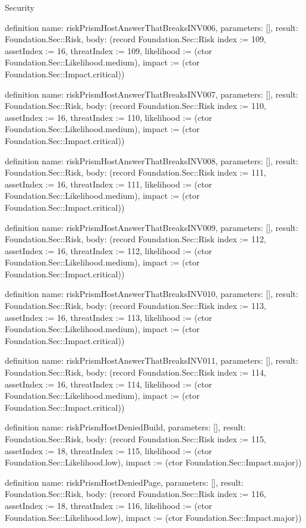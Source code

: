 \begin{lexlean}{Security}
\begin{semanticmodule}
definition{
  name: riskPrismHostAnswerThatBreaksINV006,
  parameters: [],
  result: Foundation.Sec::Risk,
  body: (record Foundation.Sec::Risk {index := 109, assetIndex := 16, threatIndex := 109, likelihood := (ctor Foundation.Sec::Likelihood.medium), impact := (ctor Foundation.Sec::Impact.critical)})
}

definition{
  name: riskPrismHostAnswerThatBreaksINV007,
  parameters: [],
  result: Foundation.Sec::Risk,
  body: (record Foundation.Sec::Risk {index := 110, assetIndex := 16, threatIndex := 110, likelihood := (ctor Foundation.Sec::Likelihood.medium), impact := (ctor Foundation.Sec::Impact.critical)})
}

definition{
  name: riskPrismHostAnswerThatBreaksINV008,
  parameters: [],
  result: Foundation.Sec::Risk,
  body: (record Foundation.Sec::Risk {index := 111, assetIndex := 16, threatIndex := 111, likelihood := (ctor Foundation.Sec::Likelihood.medium), impact := (ctor Foundation.Sec::Impact.critical)})
}

definition{
  name: riskPrismHostAnswerThatBreaksINV009,
  parameters: [],
  result: Foundation.Sec::Risk,
  body: (record Foundation.Sec::Risk {index := 112, assetIndex := 16, threatIndex := 112, likelihood := (ctor Foundation.Sec::Likelihood.medium), impact := (ctor Foundation.Sec::Impact.critical)})
}

definition{
  name: riskPrismHostAnswerThatBreaksINV010,
  parameters: [],
  result: Foundation.Sec::Risk,
  body: (record Foundation.Sec::Risk {index := 113, assetIndex := 16, threatIndex := 113, likelihood := (ctor Foundation.Sec::Likelihood.medium), impact := (ctor Foundation.Sec::Impact.critical)})
}

definition{
  name: riskPrismHostAnswerThatBreaksINV011,
  parameters: [],
  result: Foundation.Sec::Risk,
  body: (record Foundation.Sec::Risk {index := 114, assetIndex := 16, threatIndex := 114, likelihood := (ctor Foundation.Sec::Likelihood.medium), impact := (ctor Foundation.Sec::Impact.critical)})
}

definition{
  name: riskPrismHostDeniedBuild,
  parameters: [],
  result: Foundation.Sec::Risk,
  body: (record Foundation.Sec::Risk {index := 115, assetIndex := 18, threatIndex := 115, likelihood := (ctor Foundation.Sec::Likelihood.low), impact := (ctor Foundation.Sec::Impact.major)})
}

definition{
  name: riskPrismHostDeniedPage,
  parameters: [],
  result: Foundation.Sec::Risk,
  body: (record Foundation.Sec::Risk {index := 116, assetIndex := 18, threatIndex := 116, likelihood := (ctor Foundation.Sec::Likelihood.low), impact := (ctor Foundation.Sec::Impact.major)})
}


\end{semanticmodule}
\end{lexlean}

